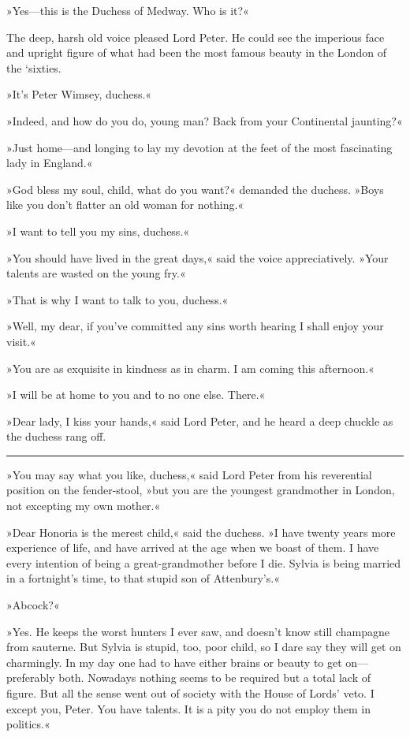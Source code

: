 »Yes—this is the Duchess of Medway. Who is it?«

The deep, harsh old voice pleased Lord Peter. He could see the imperious face and upright figure of what had been the most famous beauty in the London of the `sixties.

»It's Peter Wimsey, duchess.«

»Indeed, and how do you do, young man? Back from your Continental jaunting?«

»Just home—and longing to lay my devotion at the feet of the most fascinating lady in England.«

»God bless my soul, child, what do you want?« demanded the duchess. »Boys like you don't flatter an old woman for nothing.«

»I want to tell you my sins, duchess.«

»You should have lived in the great days,« said the voice appreciatively. »Your talents are wasted on the young fry.«

»That is why I want to talk to you, duchess.«

»Well, my dear, if you've committed any sins worth hearing I shall enjoy your visit.«

»You are as exquisite in kindness as in charm. I am coming this afternoon.«

»I will be at home to you and to no one else. There.«

»Dear lady, I kiss your hands,« said Lord Peter, and he heard a deep chuckle as the duchess rang off.

\noindent\hfil\rule{0.5\textwidth}{.4pt}\hfil 

»You may say what you like, duchess,« said Lord Peter from his reverential position on the fender-stool, »but you are the youngest grandmother in London, not excepting my own mother.«

»Dear Honoria is the merest child,« said the duchess. »I have twenty years more experience of life, and have arrived at the age when we boast of them. I have every intention of being a great-grandmother before I die. Sylvia is being married in a fortnight's time, to that stupid son of Attenbury's.«

»Abcock?«

»Yes. He keeps the worst hunters I ever saw, and doesn't know still champagne from sauterne. But Sylvia is stupid, too, poor child, so I dare say they will get on charmingly. In my day one had to have either brains or beauty to get on—preferably both. Nowadays nothing seems to be required but a total lack of figure. But all the sense went out of society with the House of Lords' veto. I except you, Peter. You have talents. It is a pity you do not employ them in politics.«

